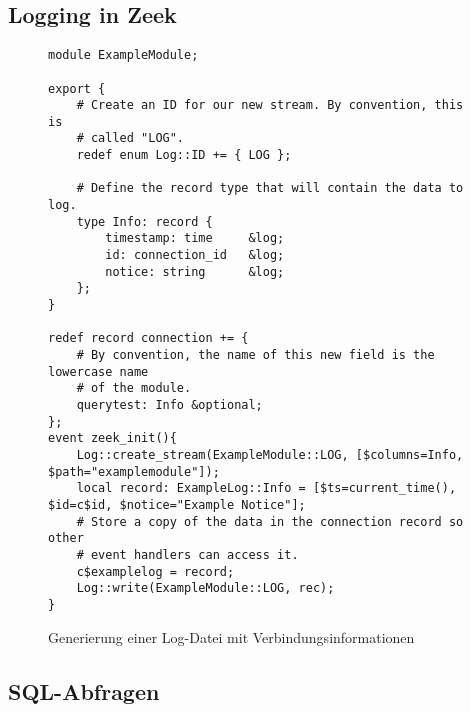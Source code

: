 \subsection{Logging in Zeek}

\begin{figure}[h!]
\centering
\begin{lstlisting}
module ExampleModule;

export {
    # Create an ID for our new stream. By convention, this is
    # called "LOG".
    redef enum Log::ID += { LOG };

    # Define the record type that will contain the data to log.
    type Info: record {
        timestamp: time		&log;
        id: connection_id	&log; 
        notice: string		&log;
    };
}

redef record connection += {
    # By convention, the name of this new field is the lowercase name
    # of the module.
    querytest: Info &optional;
};
event zeek_init(){
	Log::create_stream(ExampleModule::LOG, [$columns=Info, $path="examplemodule"]);
	local record: ExampleLog::Info = [$ts=current_time(), $id=c$id, $notice="Example Notice"];
    # Store a copy of the data in the connection record so other
    # event handlers can access it.
    c$examplelog = record;
    Log::write(ExampleModule::LOG, rec);
}
\end{lstlisting}
\caption{Generierung einer Log-Datei mit Verbindungsinformationen}
\end{figure}
\subsection{SQL-Abfragen}
